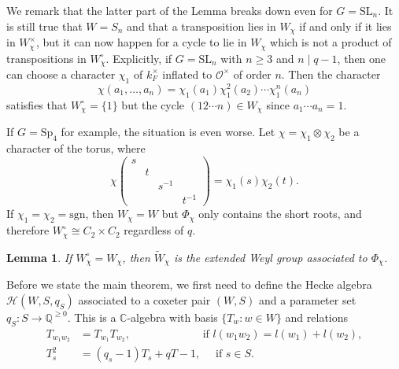 \documentclass{article}
\newcommand{\cO}{\mathcal{O}}
\newcommand{\cH}{\mathcal{H}}
\newcommand{\CC}{\mathbb{C}}
\newcommand{\QQ}{\mathbb{Q}}
\theoremstyle{plain}
\newtheorem{lemma}[theorem]{Lemma}
\theoremstyle{definition}
\begin{document}
    We remark that the latter part of the Lemma breaks down even for $G=\mathrm{SL}_n$. It is still true that $W=S_n$ and that a transposition lies in $W_\chi$ if and only if it lies in $W_\chi^\times$, but it can now happen for a cycle to lie in $W_\chi$ which is not a product of transpositions in $W_\chi^\circ$. Explicitly, if $G=\mathrm{SL}_n$ with $n\geq3$ and $n\mid q-1$, then one can choose a character $\chi_1$ of $k_F^\times$ inflated to $\cO^\times$ of order $n$. Then the character 
    $$\chi(a_1,\ldots,a_n)=\chi_1(a_1)\chi_1^2(a_2)\cdots\chi_1^n(a_n)$$
    satisfies that $W_\chi^\circ=\{1\}$ but the cycle $(12\cdots n)\in W_\chi$ since $a_1\cdots a_n=1$.

    If $G=\mathrm{Sp}_4$ for example, the situation is even worse. Let $\chi=\chi_1\otimes\chi_2$ be a character of the torus, where 
    \begin{equation}
        \chi\left(\begin{smallmatrix}
            s&&&\\
            &t&&\\
            &&s^{-1}&\\
            &&&t^{-1}
        \end{smallmatrix}\right)=\chi_1(s)\chi_2(t).
    \end{equation}
    If $\chi_1=\chi_2=\textrm{sgn}$, then $W_\chi=W$ but $\Phi_\chi$ only contains the short roots, and therefore $W_\chi^\circ\cong C_2\times C_2$ regardless of $q$.

    \begin{lemma}
        If $W_\chi^\circ=W_\chi$, then $\tilde{W}_\chi$ is the extended Weyl group associated to $\Phi_\chi$. 
    \end{lemma}

    Before we state the main theorem, we first need to define the Hecke algebra $\cH(W,S,q_S)$ associated to a coxeter pair $(W,S)$ and a parameter set $q_S:S\rightarrow\QQ^{\geq0}$. This is a $\CC$-algebra with basis $\{T_w:w\in W\}$ and relations
    \begin{align*}
        T_{w_1w_2}&=T_{w_1}T_{w_2}, \ \quad\quad\quad\quad\quad\quad\text{ if } l(w_1w_2)=l(w_1)+l(w_2),\\
        T_s^2&=(q_s-1)T_s+qT-1,\quad \text{ if } s\in S.
    \end{align*}
\end{document}
